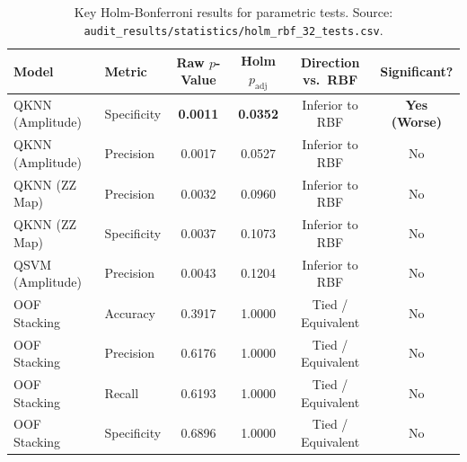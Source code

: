 \begin{table}[H]
\centering
\small
\caption{Key Holm-Bonferroni results for parametric tests. Source: \texttt{audit\_results/statistics/holm\_rbf\_32\_tests.csv}.}
\label{tab:holm-parametric-key}
\begin{tabularx}{\textwidth}{llcccc}
\toprule
\textbf{Model} & \textbf{Metric} & \textbf{Raw $p$-Value} & \textbf{Holm $p_{\mathrm{adj}}$} & \textbf{Direction vs.\ RBF} & \textbf{Significant?} \\
\midrule
QKNN (Amplitude) & Specificity & \textbf{0.0011} & \textbf{0.0352} & Inferior to RBF & \textbf{Yes (Worse)} \\
QKNN (Amplitude) & Precision   & 0.0017 & 0.0527 & Inferior to RBF & No \\
QKNN (ZZ Map)    & Precision   & 0.0032 & 0.0960 & Inferior to RBF & No \\
QKNN (ZZ Map)    & Specificity & 0.0037 & 0.1073 & Inferior to RBF & No \\
QSVM (Amplitude) & Precision   & 0.0043 & 0.1204 & Inferior to RBF & No \\
\midrule
OOF Stacking & Accuracy    & 0.3917 & 1.0000 & Tied / Equivalent & No \\
OOF Stacking & Precision   & 0.6176 & 1.0000 & Tied / Equivalent & No \\
OOF Stacking & Recall      & 0.6193 & 1.0000 & Tied / Equivalent & No \\
OOF Stacking & Specificity & 0.6896 & 1.0000 & Tied / Equivalent & No \\
\bottomrule
\end{tabularx}
\end{table}


